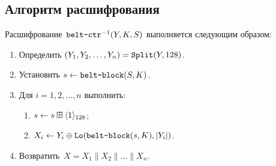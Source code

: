 \subsection{Алгоритм расшифрования}\label{CTR.Decr}

Расшифрование~$\texttt{belt-ctr}^{-1}(Y,K,S)$ выполняется следующим образом:
\begin{enumerate}
\item
Определить $(Y_1,Y_2,\ldots,Y_n)=\mathop{\texttt{Split}}\nolimits(Y,128)$.
\item
Установить 
$s\leftarrow \texttt{belt-block}(S,K)$.
\item
Для $i=1,2,\ldots,n$ выполнить:
\begin{enumerate}
\item
$s\leftarrow s\boxplus\langle1\rangle_{128}$;
\item
$X_i\leftarrow Y_i\oplus\mathop{\texttt{Lo}}\nolimits(\texttt{belt-block}(s,K),|Y_i|)$.
\end{enumerate}
\item
Возвратить~$X=X_1\parallel X_2\parallel\ldots\parallel X_n$.
\end{enumerate}
